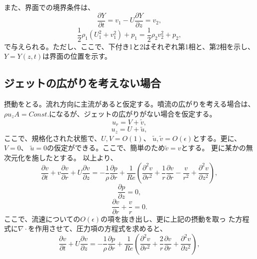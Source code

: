 また、界面での境界条件は、
\begin{equation}
 \frac{\partial Y}{\partial t} = v_1 - U\frac{\partial Y}{\partial z} = v_2,
\end{equation}
\begin{equation}
 \frac{1}{2}\rho_1 \left(U_1^2 + v_1^2\right) + p_1
  = \frac{1}{2} \rho_2 v_2^2 + p_2,
\end{equation}
で与えられる。ただし、ここで、下付き1と2はそれぞれ第1相と、第2相を示し、
$Y=Y(z,t)$は界面の位置を示す。
\subsection{ジェットの広がりを考えない場合}
摂動をとる。流れ方向に主流があると仮定する。噴流の広がりを考える場合は、
$\rho u_z A = Const.$になるが、ジェットの広がりがない場合を仮定する。
\begin{equation}
 u_r = V + \tilde{v},
\end{equation}
\begin{equation}
 u_z = U + \tilde{u},
\end{equation}
ここで、規格化された状態で、$U, V = O(1)$、
$\tilde{u}, \tilde{v} = O (\epsilon)$とする。更に、$V = 0$、
$\tilde{u} = 0$の仮定ができる。ここで、簡単のため$\tilde{v}=v$とする。
更に某かの無次元化を施したとする。
以上より、
\begin{equation}
 \frac{\partial v}{\partial t}
  + v\frac{\partial v}{\partial r}
  + U\frac{\partial v}{\partial z}
  = -\frac{1}{\rho}\frac{\partial p}{\partial r}
  + \frac{1}{Re}\left(
		\frac{\partial^2v}{\partial r^2}
		+\frac{1}{r}\frac{\partial v}{\partial r}
		-\frac{v}{r^2}
		+\frac{\partial^2v}{\partial z^2}\right),
\end{equation}
\begin{equation}
 \frac{\partial p}{\partial z} = 0,
\end{equation}
\begin{equation}
 \frac{\partial v}{\partial r}+\frac{v}{r} = 0.
\end{equation}
ここで、流速についての$O(\epsilon)$の項を抜き出し、更に上記の摂動を取っ
た方程式に$\nabla\cdot$を作用させて、圧力項の方程式を求めると、
\begin{equation}
 \frac{\partial v}{\partial t}
  + U\frac{\partial v}{\partial z}
  = -\frac{1}{\rho}\frac{\partial p}{\partial r}
  + \frac{1}{Re}\left(
		\frac{\partial^2v}{\partial r^2}
		+\frac{2}{r}\frac{\partial v}{\partial r}
		+\frac{\partial^2v}{\partial z^2}\right), \label{eq_motion_cyl_inst}
\end{equation}
